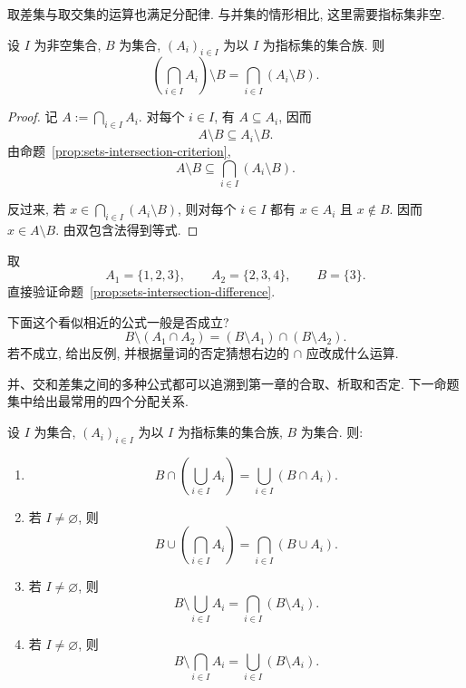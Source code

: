 \documentclass[usesamecnt, thmcnt=section, lang=cn, newtx, 10pt, scheme=chinese]{elegantbook}
\begin{document}
取差集与取交集的运算也满足分配律. 与并集的情形相比, 这里需要指标集非空.

\begin{proposition}\label{prop:sets-intersection-difference}
设 $I$ 为非空集合, $B$ 为集合, $(A_i)_{i\in I}$ 为以 $I$ 为指标集的集合族. 则
\[
 \left(\bigcap_{i\in I}A_i\right)\setminus B
 =
 \bigcap_{i\in I}(A_i\setminus B).
\]
\end{proposition}

\begin{proof}
记 $A:=\bigcap_{i\in I}A_i$. 对每个 $i\in I$, 有 $A\subseteq A_i$, 因而
\[
 A\setminus B\subseteq A_i\setminus B.
\]
由命题~\ref{prop:sets-intersection-criterion},
\[
 A\setminus B\subseteq\bigcap_{i\in I}(A_i\setminus B).
\]

反过来, 若 $x\in\bigcap_{i\in I}(A_i\setminus B)$, 则对每个 $i\in I$ 都有 $x\in A_i$ 且 $x\notin B$. 因而 $x\in A\setminus B$. 由双包含法得到等式.
\end{proof}

\begin{exercise}\label{ex:sets-intersection-diff-01}
取
\[
 A_1=\{1,2,3\},\qquad A_2=\{2,3,4\},\qquad B=\{3\}.
\]
直接验证命题~\ref{prop:sets-intersection-difference}.
\end{exercise}

\begin{exercise}\label{ex:sets-intersection-diff-02}
下面这个看似相近的公式一般是否成立?
\[
 B\setminus(A_1\cap A_2)
 =
 (B\setminus A_1)\cap(B\setminus A_2).
\]
若不成立, 给出反例, 并根据量词的否定猜想右边的 $\cap$ 应改成什么运算.
\end{exercise}

并、交和差集之间的多种公式都可以追溯到第一章的合取、析取和否定. 下一命题集中给出最常用的四个分配关系.

\begin{proposition}\label{prop:sets-distributivity}
设 $I$ 为集合, $(A_i)_{i\in I}$ 为以 $I$ 为指标集的集合族, $B$ 为集合. 则:
\begin{enumerate}[label=\rm(\arabic*)]
  \item
  \[
   B\cap\left(\bigcup_{i\in I}A_i\right)
   =
   \bigcup_{i\in I}(B\cap A_i).
  \]
  \item 若 $I\neq\varnothing$, 则
  \[
   B\cup\left(\bigcap_{i\in I}A_i\right)
   =
   \bigcap_{i\in I}(B\cup A_i).
  \]
  \item 若 $I\neq\varnothing$, 则
  \[
   B\setminus\bigcup_{i\in I}A_i
   =
   \bigcap_{i\in I}(B\setminus A_i).
  \]
  \item 若 $I\neq\varnothing$, 则
  \[
   B\setminus\bigcap_{i\in I}A_i
   =
   \bigcup_{i\in I}(B\setminus A_i).
  \]
\end{enumerate}
\end{proposition}
\end{document}
